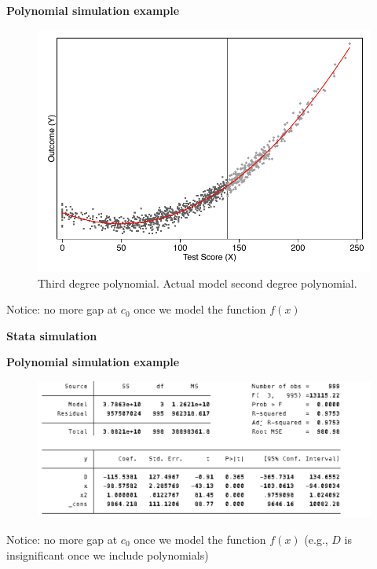 \documentclass[notes=show]{beamer}
\begin{document}
\begin{frame}[plain]
	\begin{center}
	\textbf{Polynomial simulation example}
	\end{center}

\begin{figure}
\includegraphics[scale=0.55]{./lecture_includes/more_flex.pdf}
\caption{Third degree polynomial. Actual model second degree polynomial.}
\end{figure}

Notice: no more gap at $c_0$ once we model the function $f(x)$
\end{frame}

\begin{frame}[plain]
\begin{center}
\textbf{Stata simulation}
\end{center}


 

\end{frame}


\begin{frame}[plain]
	\begin{center}
	\textbf{Polynomial simulation example}
	\end{center}

\begin{figure}
\includegraphics[scale=0.2]{./lecture_includes/poly6.png}
\end{figure}

Notice: no more gap at $c_0$ once we model the function $f(x)$ (e.g., $D$ is insignificant once we include polynomials)
\end{frame}
\end{document}
